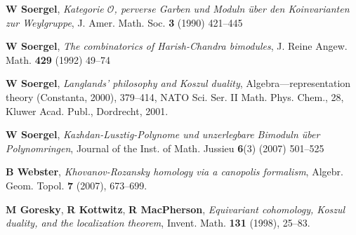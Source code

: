 \documentclass[12pt]{wart}
\theoremstyle{remark}
\begin{document}
\begin{thebibliography}[DGMS]{}
\textbf{W Soergel}, \emph{Kategorie {$\mathcal{ O}$}, perverse {G}arben und
  {M}oduln \"uber den {K}oinvarianten zur {W}eylgruppe}, J. Amer. Math. Soc.  \textbf{3}
  (1990) 421--445

\textbf{W Soergel}, \emph{The combinatorics of {H}arish-{C}handra bimodules},
  J. Reine Angew. Math.  \textbf{429} (1992) 49--74

\textbf{W Soergel}, \emph{Langlands' philosophy and Koszul duality}, Algebra---representation theory (Constanta, 2000),  379--414,
NATO Sci. Ser. II Math. Phys. Chem., 28, Kluwer Acad. Publ., Dordrecht, 2001.

\textbf{W Soergel}, \emph{Kazhdan-Lusztig-Polynome und unzerlegbare Bimoduln \"uber Polynomringen}, Journal of the Inst. of Math. Jussieu  \textbf{6}(3) (2007) 501--525


\textbf{B Webster}, \emph{{Khovanov-{R}ozansky homology via a canopolis formalism}}, Algebr. Geom. Topol.  \textbf{7}  (2007), 673--699.

\textbf{M Goresky}, \textbf{R Kottwitz}, \textbf{R MacPherson},
\emph{Equivariant cohomology, {K}oszul duality, and the localization
  theorem}, Invent. Math.  \textbf{131} (1998), 25--83.
\end{thebibliography}
\end{document}
